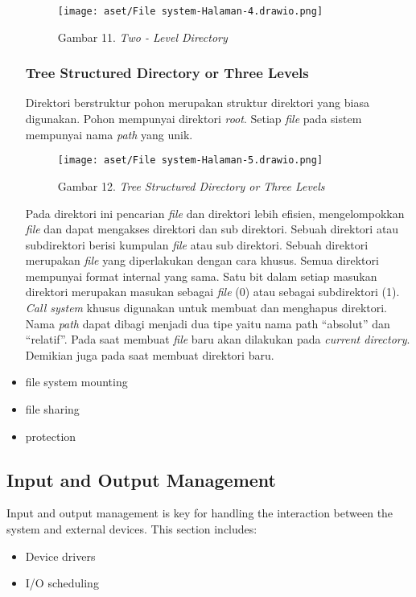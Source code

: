 \documentclass[12pt]{article}
\begin{document}
\begin{itemize}
	\begin{figure}[h!]
		\centering
		\texttt{[image: aset/File system-Halaman-4.drawio.png]}
		\captionsetup{labelformat=empty}
		\caption{Gambar 11. \textit{Two - Level Directory}}
	\end{figure}
	
	\subsubsection{Tree Structured Directory or Three Levels }
	Direktori berstruktur pohon merupakan struktur direktori yang biasa digunakan. Pohon mempunyai direktori \textit{root}. Setiap \textit{file }pada sistem mempunyai nama \textit{path} yang unik.
	
	\begin{figure}[h!]
		\centering
		\texttt{[image: aset/File system-Halaman-5.drawio.png]}
		\captionsetup{labelformat=empty}
		\caption{Gambar 12.\textit{ Tree Structured Directory or Three Levels}}
	\end{figure}
	
	Pada direktori ini pencarian \textit{file} dan direktori lebih efisien, mengelompokkan \textit{file} dan dapat mengakses direktori dan sub direktori. Sebuah direktori atau subdirektori berisi kumpulan \textit{file} atau sub direktori. Sebuah direktori merupakan \textit{file} yang diperlakukan dengan cara khusus. Semua direktori mempunyai format internal yang sama. Satu bit dalam setiap masukan direktori merupakan masukan sebagai \textit{file} (0) atau sebagai subdirektori (1). \textit{Call system} khusus digunakan untuk membuat dan menghapus direktori. Nama \textit{path} dapat dibagi menjadi dua tipe yaitu nama path “absolut” dan “relatif”. Pada saat membuat \textit{file} baru akan dilakukan pada \textit{current directory}. Demikian juga pada saat membuat direktori baru.
		
		\item file system mounting
		\item file sharing
		\item protection
	\end{itemize}
	
	\subsection{Input and Output Management}
	Input and output management is key for handling the interaction between the system and external devices. This section includes:
	\begin{itemize}
		\item Device drivers
		\item I/O scheduling
	\end{itemize}
	
\end{document}

